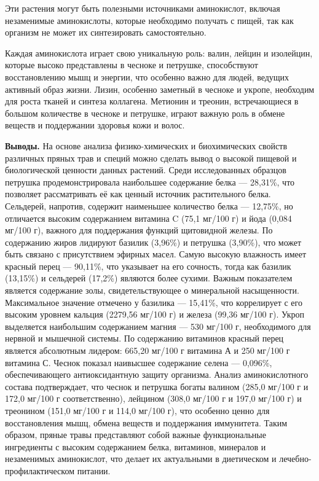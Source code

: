 \begin{multicols}{2}
Эти растения могут быть полезными источниками аминокислот, включая
незаменимые аминокислоты, которые необходимо получать с пищей, так как
организм не может их синтезировать самостоятельно.

Каждая аминокислота играет свою уникальную роль: валин, лейцин и
изолейцин, которые высоко представлены в чесноке и петрушке,
способствуют восстановлению мышц и энергии, что особенно важно для
людей, ведущих активный образ жизни. Лизин, особенно заметный в чесноке
и укропе, необходим для роста тканей и синтеза коллагена. Метионин и
треонин, встречающиеся в большом количестве в чесноке и петрушке, играют
важную роль в обмене веществ и поддержании здоровья кожи и волос.

{\bfseries Выводы.} На основе анализа физико-химических и биохимических
свойств различных пряных трав и специй можно сделать вывод о высокой
пищевой и биологической ценности данных растений. Среди исследованных
образцов петрушка продемонстрировала наибольшее содержание белка ---
28,31\%, что позволяет рассматривать её как ценный источник
растительного белка. Сельдерей, напротив, содержит наименьшее количество
белка --- 12,75\%, но отличается высоким содержанием витамина C (75,1
мг/100 г) и йода (0,084 мг/100 г), важного для поддержания функций
щитовидной железы. По содержанию жиров лидируют базилик (3,96\%) и
петрушка (3,90\%), что может быть связано с присутствием эфирных масел.
Самую высокую влажность имеет красный перец --- 90,11\%, что указывает
на его сочность, тогда как базилик (13,15\%) и сельдерей (17,2\%)
являются более сухими. Важным показателем является содержание золы,
свидетельствующее о минеральной насыщенности. Максимальное значение
отмечено у базилика --- 15,41\%, что коррелирует с его высоким уровнем
кальция (2279,56 мг/100 г) и железа (99,36 мг/100 г). Укроп выделяется
наибольшим содержанием магния --- 530 мг/100 г, необходимого для нервной
и мышечной системы. По содержанию витаминов красный перец является
абсолютным лидером: 665,20 мг/100 г витамина А и 250 мг/100 г витамина
С. Чеснок показал наивысшее содержание селена --- 0,096\%,
обеспечивающего антиоксидантную защиту организма. Анализ аминокислотного
состава подтверждает, что чеснок и петрушка богаты валином (285,0 мг/100
г и 172,0 мг/100 г соответственно), лейцином (308,0 мг/100 г и 197,0
мг/100 г) и треонином (151,0 мг/100 г и 114,0 мг/100 г), что особенно
ценно для восстановления мышц, обмена веществ и поддержания иммунитета.
Таким образом, пряные травы представляют собой важные функциональные
ингредиенты с высоким содержанием белка, витаминов, минералов и
незаменимых аминокислот, что делает их актуальными в диетическом и
лечебно-профилактическом питании.


\end{multicols}
